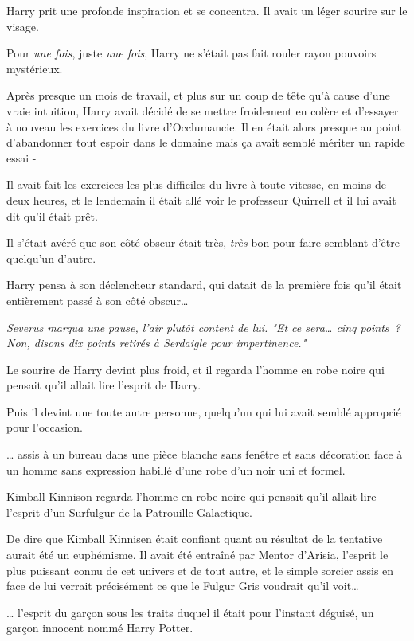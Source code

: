 Harry prit une profonde inspiration et se concentra. Il avait un léger sourire sur le visage.

Pour \emph{une fois}, juste \emph{une fois}, Harry ne s'était pas fait rouler rayon pouvoirs mystérieux.

Après presque un mois de travail, et plus sur un coup de tête qu'à cause d'une vraie intuition, Harry avait décidé de se mettre froidement en colère et d'essayer à nouveau les exercices du livre d'Occlumancie. Il en était alors presque au point d'abandonner tout espoir dans le domaine mais ça avait semblé mériter un rapide essai -

Il avait fait les exercices les plus difficiles du livre à toute vitesse, en moins de deux heures, et le lendemain il était allé voir le professeur Quirrell et il lui avait dit qu'il était prêt.

Il s'était avéré que son côté obscur était très, \emph{très} bon pour faire semblant d'être quelqu'un d'autre.

Harry pensa à son déclencheur standard, qui datait de la première fois qu'il était entièrement passé à son côté obscur…

\emph{Severus marqua une pause, l'air plutôt content de lui. "Et ce sera… cinq points~? Non, disons dix points retirés à Serdaigle pour impertinence."}

Le sourire de Harry devint plus froid, et il regarda l'homme en robe noire qui pensait qu'il allait lire l'esprit de Harry.

Puis il devint une toute autre personne, quelqu'un qui lui avait semblé approprié pour l'occasion.

\later

… assis à un bureau dans une pièce blanche sans fenêtre et sans décoration face à un homme sans expression habillé d’une robe d'un noir uni et formel.

Kimball Kinnison regarda l'homme en robe noire qui pensait qu'il allait lire l'esprit d'un Surfulgur de la Patrouille Galactique.

De dire que Kimball Kinnisen était confiant quant au résultat de la tentative aurait été un euphémisme. Il avait été entraîné par Mentor d'Arisia, l'esprit le plus puissant connu de cet univers et de tout autre, et le simple sorcier assis en face de lui verrait précisément ce que le Fulgur Gris voudrait qu'il voit…

… l'esprit du garçon sous les traits duquel il était pour l'instant déguisé, un garçon innocent nommé Harry Potter.

